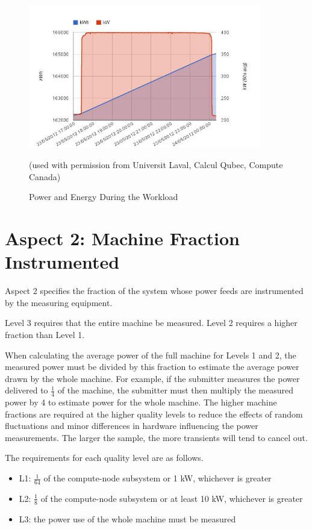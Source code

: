\begin{figure}
\centering
\includegraphics[width=4in]{fig3-6}
\caption{Power and Energy During the Workload}
(used with permission from Universit Laval, Calcul Qubec, Compute Canada)
\label{fig:powengwl}
\end{figure}

\section{Aspect 2: Machine Fraction Instrumented}
\label{sec:A2MFI}
\noindent
Aspect 2 specifies the fraction of the system whose power feeds are instrumented by the measuring equipment. 
\wl

\noindent
Level 3 requires that the entire machine be measured. Level 2 requires a higher fraction than Level 1.
\wl

\noindent
When calculating the average power of the full machine for Levels 1 and 2, the measured power must be divided by this fraction to 
estimate the average power drawn by the whole machine. For example, if the submitter measures the power delivered 
to $ \frac{1}{4} $ of the machine, the submitter must then multiply the measured power by 4 to estimate power for the whole machine.  
The higher machine fractions are required at the higher quality levels to reduce the effects of random fluctuations and minor differences in hardware influencing the power measurements.  The larger the sample, the more transients will tend to cancel out.
\wl

\noindent
The requirements for each quality level are as follows.

\begin{itemize}
\item
L1: $ \frac{1}{64} $ of the compute-node subsystem or 1 kW, whichever is greater
\item
L2: $ \frac{1}{8} $ of the compute-node subsystem or at least 10 kW, whichever is greater
\item
L3: the power use of the whole machine must be measured
\end{itemize}


